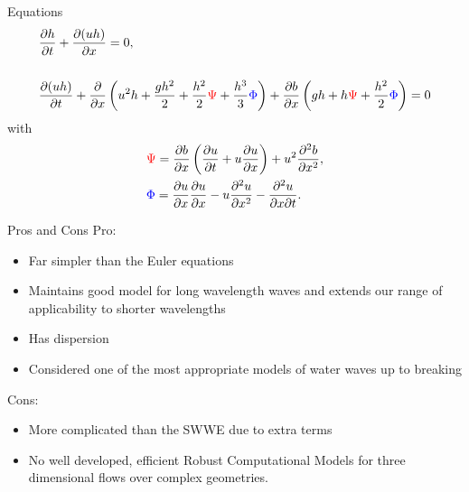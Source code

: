\documentclass[pdf]{beamer}
\begin{document}
\begin{frame}{Equations}
	\begin{subequations}
		\begin{align*}
		&\frac{\partial h}{\partial t} + \dfrac{\partial (uh)}{\partial x} = 0,  \\ \\
		&\dfrac{\partial (uh)}{\partial t} + \dfrac{\partial}{\partial x} \left ( u^2h + \dfrac{gh^2}{2} + \dfrac{h^2}{2}{ \color{red}\Psi } + \dfrac{h^3}{3}{ { \color{blue} \Phi } }  \right )  +  \dfrac{\partial b}{\partial x} \left (gh +   h { \color{red}\Psi } + \dfrac{h^2}{2}{ { \color{blue} \Phi } }  \right ) = 0
		\end{align*}
	\end{subequations}
	with
		\begin{align*}
		&{ \color{red}\Psi }  = \dfrac{\partial b}{\partial x}\left(\dfrac{\partial u}{\partial t} + u\dfrac{\partial u}{\partial x} \right)  + u^2\dfrac{\partial^2 b}{\partial x^2}, \\&
		{ \color{blue} \Phi }  = \dfrac{\partial u }{\partial x} \dfrac{\partial u}{\partial x} -u \dfrac{\partial^2 u}{\partial x^2}  - \dfrac{\partial^2 u}{\partial x \partial t} .
		\end{align*}
\end{frame}
\begin{frame}{Pros and Cons}
	Pro:
	\begin{itemize}
		\item Far simpler than the Euler equations
		\item Maintains good model for long wavelength waves and extends our range of applicability to shorter wavelengths
		\item Has dispersion
		\item Considered one of the most appropriate models of water waves up to breaking
	\end{itemize}
	Cons:
	\begin{itemize}
		\item More complicated than the SWWE due to extra terms
		\item No well developed, efficient Robust Computational Models for three dimensional flows over complex geometries. 
	\end{itemize}
\end{frame}
\end{document}

